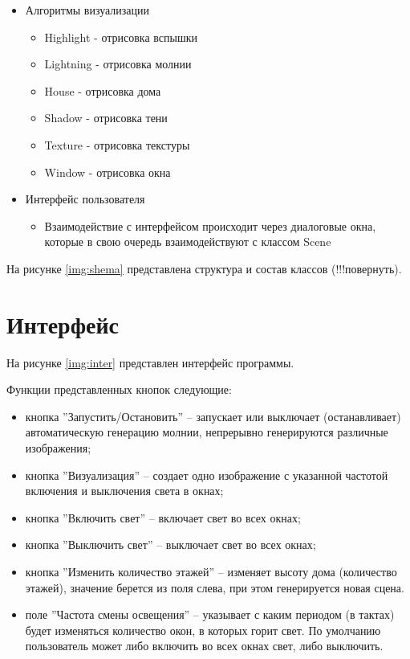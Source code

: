 \begin{itemize}
\begin{itemize}
	\end{itemize}
	\item Алгоритмы визуализации
	\begin{itemize}
		\item Highlight - отрисовка вспышки
		\item Lightning - отрисовка молнии
		\item House - отрисовка дома
		\item Shadow - отрисовка тени
		\item Texture - отрисовка текстуры
		\item Window - отрисовка окна
	\end{itemize}
	\item Интерфейс пользователя
	\begin{itemize}
		\item Взаимодействие с интерфейсом происходит через диалоговые окна, которые в свою очередь взаимодействуют с классом Scene
	\end{itemize}	
\end{itemize}

На рисунке \ref{img:shema} представлена структура и состав классов (!!!повернуть).

\clearpage

\section{Интерфейс}
На рисунке \ref{img:inter} представлен интерфейс программы.


Функции представленных кнопок следующие:
\begin{itemize}
	\item кнопка ''Запустить/Остановить'' -- запускает или выключает (останавливает) автоматическую генерацию молнии, непрерывно генерируются различные изображения;
	\item кнопка ''Визуализация'' -- создает одно изображение с указанной частотой включения и выключения света в окнах;
	\item кнопка ''Включить свет'' -- включает свет во всех окнах;
	\item кнопка ''Выключить свет'' -- выключает свет во всех окнах;
	\item кнопка ''Изменить количество этажей'' -- изменяет высоту дома (количество этажей), значение берется из поля слева, при этом генерируется новая сцена.
	\item поле ''Частота смены освещения'' -- указывает с каким периодом (в тактах) будет изменяться количество окон, в которых горит свет. По умолчанию пользователь может либо включить во всех окнах свет, либо выключить.
	
\end{itemize}

